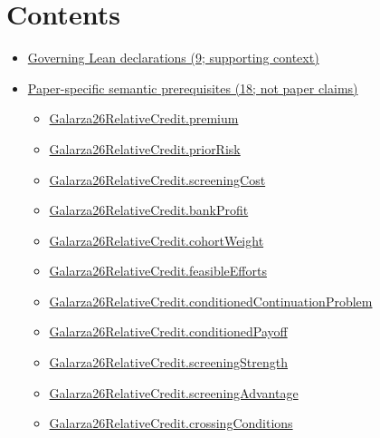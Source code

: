 \documentclass[10pt]{article}
\begin{document}
\section*{Contents}
\begin{itemize}[leftmargin=1.2em]
\item \hyperlink{governing-declaration-section-5ef5ef0364b6939c}{Governing Lean declarations (9; supporting context)}
\item \hyperlink{paper-prerequisite-section-5ef5ef0364b6939c}{Paper-specific semantic prerequisites (18; not paper claims)}
\begin{itemize}[leftmargin=1.2em]
\item \hyperlink{paper-prerequisite-6956aaccf5fffc8f}{Galarza26\allowbreak{}Relative\allowbreak{}Credit.\allowbreak{}premium}
\item \hyperlink{paper-prerequisite-e8657fe6a37f000a}{Galarza26\allowbreak{}Relative\allowbreak{}Credit.\allowbreak{}prior\allowbreak{}Risk}
\item \hyperlink{paper-prerequisite-3f518444e1a02f7c}{Galarza26\allowbreak{}Relative\allowbreak{}Credit.\allowbreak{}screening\allowbreak{}Cost}
\item \hyperlink{paper-prerequisite-646bdd87bd4c2b85}{Galarza26\allowbreak{}Relative\allowbreak{}Credit.\allowbreak{}bank\allowbreak{}Profit}
\item \hyperlink{paper-prerequisite-b0571b2c4a78eab5}{Galarza26\allowbreak{}Relative\allowbreak{}Credit.\allowbreak{}cohort\allowbreak{}Weight}
\item \hyperlink{paper-prerequisite-3564270d1ab44650}{Galarza26\allowbreak{}Relative\allowbreak{}Credit.\allowbreak{}feasible\allowbreak{}Efforts}
\item \hyperlink{paper-prerequisite-a6fae381e2d9a684}{Galarza26\allowbreak{}Relative\allowbreak{}Credit.\allowbreak{}conditioned\allowbreak{}Continuation\allowbreak{}Problem}
\item \hyperlink{paper-prerequisite-0bf7e0c122a51179}{Galarza26\allowbreak{}Relative\allowbreak{}Credit.\allowbreak{}conditioned\allowbreak{}Payoff}
\item \hyperlink{paper-prerequisite-edcf6b4879cafd1b}{Galarza26\allowbreak{}Relative\allowbreak{}Credit.\allowbreak{}screening\allowbreak{}Strength}
\item \hyperlink{paper-prerequisite-29fcb63a4a0578b3}{Galarza26\allowbreak{}Relative\allowbreak{}Credit.\allowbreak{}screening\allowbreak{}Advantage}
\item \hyperlink{paper-prerequisite-4f59b48de0be00ac}{Galarza26\allowbreak{}Relative\allowbreak{}Credit.\allowbreak{}crossing\allowbreak{}Conditions}

\end{itemize}
\end{itemize}
\end{document}
